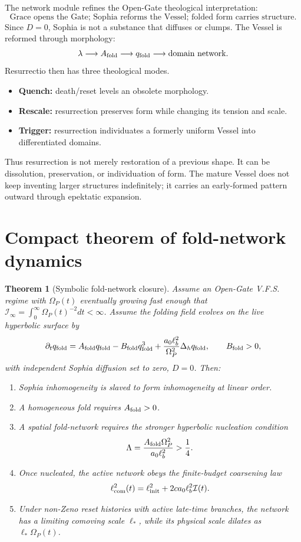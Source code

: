 \documentclass[11pt]{article}
\newcommand{\Op}{\Omega_P}
\newcommand{\qf}{q_{\rm fold}}
\newcommand{\Af}{A_{\rm fold}}
\newcommand{\Bf}{B_{\rm fold}}
\newcommand{\ellcom}{\ell_{\rm com}}
\newcommand{\ellinit}{\ell_{\rm init}}
\newcommand{\Lam}{\Lambda}
\newcommand{\Iconf}{\mathcal I}
\theoremstyle{definition}
\theoremstyle{plain}
\newtheorem{theorem}{Theorem}[section]
\begin{document}
The network module refines the Open-Gate theological interpretation:
\[
\boxed{\text{Grace opens the Gate; Sophia reforms the Vessel; folded form carries structure.}}
\]
Since $D=0$, Sophia is not a substance that diffuses or clumps.  The Vessel is reformed through morphology:
\[
\lambda\longrightarrow \Af\longrightarrow \qf\longrightarrow \text{domain network}.
\]
Resurrectio then has three theological modes.
\begin{itemize}
\item \textbf{Quench:} death/reset levels an obsolete morphology.
\item \textbf{Rescale:} resurrection preserves form while changing its tension and scale.
\item \textbf{Trigger:} resurrection individuates a formerly uniform Vessel into differentiated domains.
\end{itemize}
Thus resurrection is not merely restoration of a previous shape.  It can be dissolution, preservation, or
individuation of form.  The mature Vessel does not keep inventing larger structures indefinitely; it carries an
early-formed pattern outward through epektatic expansion.

\section{Compact theorem of fold-network dynamics}

\begin{theorem}[Symbolic fold-network closure]
Assume an Open-Gate V.F.S. regime with $\Op(t)$ eventually growing fast enough that
$\Iconf_\infty=\int_0^\infty\Op(t)^{-2}dt<\infty$.  Assume the folding field evolves on the live hyperbolic
surface by
\[
\partial_t\qf=\Af\qf-\Bf\qf^3+\frac{a_0\ell_b^2}{\Op^2}\Delta_h\qf,
\qquad \Bf>0,
\]
with independent Sophia diffusion set to zero, $D=0$.  Then:
\begin{enumerate}
\item Sophia inhomogeneity is slaved to form inhomogeneity at linear order.
\item A homogeneous fold requires $\Af>0$.
\item A spatial fold-network requires the stronger hyperbolic nucleation condition
\[
\Lam=\frac{\Af\Op^2}{a_0\ell_b^2}>\frac14.
\]
\item Once nucleated, the active network obeys the finite-budget coarsening law
\[
\ellcom^2(t)=\ellinit^2+2ca_0\ell_b^2\Iconf(t).
\]
\item Under non-Zeno reset histories with active late-time branches, the network has a limiting comoving scale
$\ell_\ast$, while its physical scale dilates as $\ell_\ast\Op(t)$.
\end{enumerate}
\end{theorem}
\end{document}
